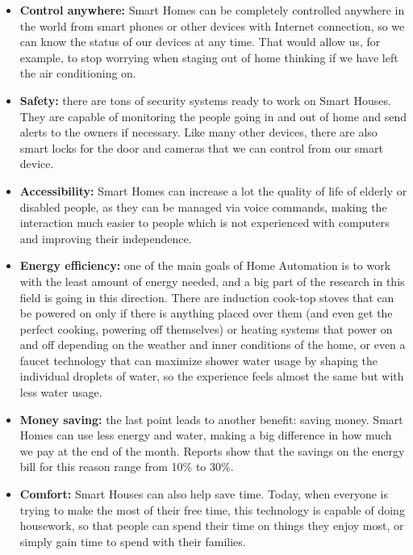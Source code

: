 \begin{itemize}
	\item \textbf{Control anywhere:} Smart Homes can be completely controlled anywhere in the world from smart phones or
	other devices with Internet connection, so we can know the status of our devices at any time. That would allow us, for
	example, to stop worrying when staging out of home thinking if we have left the air conditioning on.
	\item \textbf{Safety:} there are tons of security systems ready to work on Smart Houses. They are capable of monitoring
	the people going in and out of home and send alerts to the owners if necessary. Like many other devices, there are also
	smart locks for the door and cameras that we can control from our smart device.
	\item \textbf{Accessibility:} Smart Homes can increase a lot the quality of life of elderly or disabled people, as they can be
	managed via voice commands, making the interaction much easier to people which is not experienced with computers and
	improving their independence.
	\item \textbf{Energy efficiency:} one of the main goals of Home Automation is to work with the least amount of energy
	needed, and a big part of the research in this field is going in this direction. There are induction cook-top stoves that can be
	powered on only if there is anything placed over them (and even get the perfect cooking, powering off themselves)\cite{directenergyAdvantages}
	or heating systems that power on and off depending on the weather and inner conditions of the home, or even a faucet
	technology that can maximize shower water usage by shaping the individual droplets of water, so the experience feels
	almost the same but with less water usage.
	\item \textbf{Money saving:} the last point leads to another benefit: saving money. Smart Homes can use less energy and
	water, making a big difference in how much we pay at the end of the month. Reports show that the savings on the energy bill
	for this reason range from 10\% to 30\%.\cite{directenergyAdvantages}
	\item \textbf{Comfort:} Smart Houses can also help save time. Today, when everyone is trying to make the most of their free
	time, this technology is capable of doing housework, so that people can spend their time on things they enjoy most, or simply
	gain time  to spend with their families.
\end{itemize}

